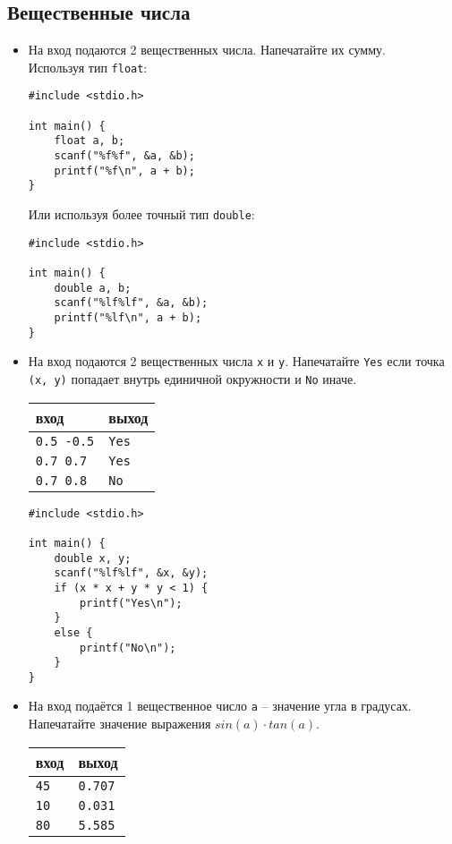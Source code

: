 \documentclass{article}
\begin{document}
\subsection*{Вещественные числа}
\begin{itemize}
\item На вход подаются 2 вещественных числа. Напечатайте их сумму. \\
Используя тип \texttt{float}:
\begin{lstlisting}[backgroundcolor = \color{solcolor}]
#include <stdio.h>

int main() {
    float a, b;
    scanf("%f%f", &a, &b);
    printf("%f\n", a + b);
}
\end{lstlisting}
Или используя более точный тип \texttt{double}:
\begin{lstlisting}[backgroundcolor = \color{solcolor}]
#include <stdio.h>

int main() {
    double a, b;
    scanf("%lf%lf", &a, &b);
    printf("%lf\n", a + b);
}
\end{lstlisting}
\item На вход подаются 2 вещественных числа \texttt{x} и \texttt{y}. Напечатайте \texttt{Yes} если точка \texttt{(x, y)} попадает внутрь единичной окружности и \texttt{No} иначе.
\begin{center}
\begin{tabular}{ l | l }
 вход & выход \\ \hline
 \texttt{0.5 -0.5} & \texttt{Yes}  \\ \hline
 \texttt{0.7 0.7} & \texttt{Yes}  \\ \hline
 \texttt{0.7 0.8} & \texttt{No}  \\ 
\end{tabular}
\end{center}
\begin{lstlisting}[backgroundcolor = \color{solcolor}]
#include <stdio.h>

int main() {
    double x, y;
    scanf("%lf%lf", &x, &y);
    if (x * x + y * y < 1) {
        printf("Yes\n");
    }
    else {
        printf("No\n");
    }
}
\end{lstlisting}
\item На вход подаётся 1 вещественное число \texttt{a} -- значение угла в градусах. Напечатайте значение выражения $sin(a) \cdot tan(a)$.
\begin{center}
\begin{tabular}{ l | l }
 вход & выход \\ \hline
 \texttt{45} & \texttt{0.707}  \\ \hline
 \texttt{10} & \texttt{0.031}  \\ \hline
 \texttt{80} & \texttt{5.585}  \\ 
\end{tabular}
\end{center}


\end{itemize}
\end{document}
